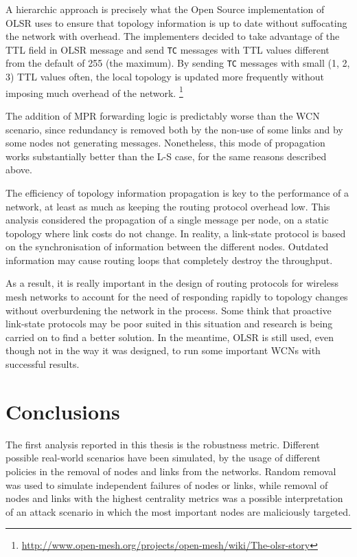 \documentclass[oneside,openany]{memoir}
\begin{document}
A hierarchic approach is precisely what the Open Source implementation of OLSR
uses to ensure that topology information is up to date without suffocating
the network with overhead. The implementers decided to take advantage of the
TTL field in OLSR message and send \texttt{TC} messages with TTL values
different from the default of 255 (the maximum). By sending \texttt{TC}
messages with small (1, 2, 3) TTL values often, the local topology is
updated more frequently without imposing much overhead of the network.
\footnote{\url{http://www.open-mesh.org/projects/open-mesh/wiki/The-olsr-story}}

The addition of MPR forwarding logic is predictably worse than the WCN scenario,
since redundancy is removed both by the non-use of some links and by some nodes
not generating messages.
Nonetheless, this mode of propagation works substantially better than the L-S
case, for the same reasons described above.

The efficiency of topology information propagation is key to the performance of
a network, at least as much as keeping the routing protocol overhead low.
This analysis considered the propagation of a single message per node, on a
static topology where link costs do not change.
In reality, a link-state protocol is based on the synchronisation of information
between the different nodes. Outdated information may cause routing loops that
completely destroy the throughput.

As a result, it is really important in the design of routing protocols for
wireless mesh networks to account for the need of responding rapidly to
topology changes without overburdening the network in the process.
Some think that proactive link-state protocols may be poor suited in this
situation and research is being carried on to find a better solution.
In the meantime, OLSR is still used, even though not in the way it was designed,
to run some important WCNs with successful results.

\chapter{Conclusions}\label{conclusions}

The first analysis reported in this thesis is the robustness metric.
Different possible real-world scenarios have been simulated, by the usage
of different policies in the removal of nodes and links from the networks.
Random removal was used to simulate independent failures of nodes or links,
while removal of nodes and links with the highest centrality metrics was a
possible interpretation of an attack scenario in which the most important
nodes are maliciously targeted.
\end{document}

